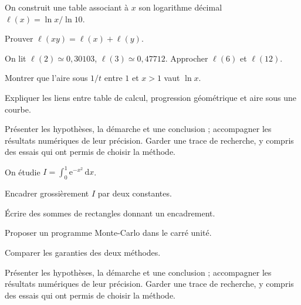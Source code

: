 \label{projet-3}
On construit une table associant à $x$ son logarithme décimal $\ell(x)=\ln x/\ln10$.
\begin{questions}
\item Prouver $\ell(xy)=\ell(x)+\ell(y)$.
\item On lit $\ell(2)\simeq0{,}30103$, $\ell(3)\simeq0{,}47712$. Approcher $\ell(6)$ et $\ell(12)$.
\item Montrer que l’aire sous $1/t$ entre $1$ et $x>1$ vaut $\ln x$.
\item Expliquer les liens entre table de calcul, progression géométrique et aire sous une courbe.
\end{questions}
\vspace{5mm}\noindent Présenter les hypothèses, la démarche et une conclusion ; accompagner les résultats numériques de leur précision. Garder une trace de recherche, y compris des essais qui ont permis de choisir la méthode.\par\vfill{}\par\vspace{2mm}\noindent{}
\label{projet-4}
On étudie $I=\int_0^1\mathrm e^{-x^2}\,\mathrm dx$.
\begin{questions}
\item Encadrer grossièrement $I$ par deux constantes.
\item Écrire des sommes de rectangles donnant un encadrement.
\item Proposer un programme Monte-Carlo dans le carré unité.
\item Comparer les garanties des deux méthodes.
\end{questions}
\vspace{5mm}\noindent Présenter les hypothèses, la démarche et une conclusion ; accompagner les résultats numériques de leur précision. Garder une trace de recherche, y compris des essais qui ont permis de choisir la méthode.\par\vfill{}\par\vspace{2mm}\noindent{}
